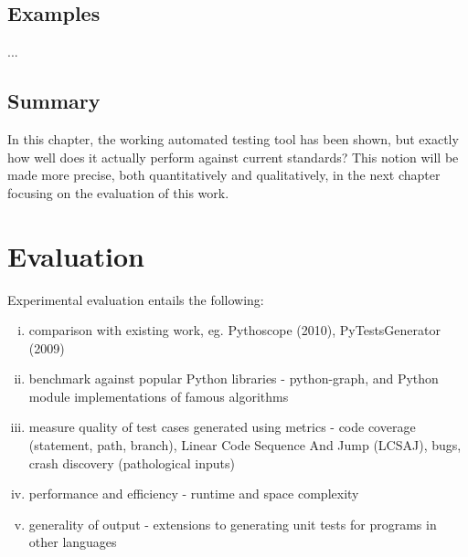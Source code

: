 \documentclass{icldt}
\numberwithin{equation}{section}       %
\begin{document}
\section{Examples}
...
\section{Summary}
In this chapter, the working automated testing tool has been shown, but exactly how well does it actually perform against current standards? This notion will be made more precise, both quantitatively and qualitatively, in the next chapter focusing on the evaluation of this work.
\chapter{Evaluation}
\label{ch:eval}

Experimental evaluation entails the following:
\begin{enumerate}[i.]
	\item comparison with existing work, eg. Pythoscope (2010), PyTestsGenerator (2009)
	\item benchmark against popular Python libraries - python-graph, and Python module implementations of famous algorithms
	\item measure quality of test cases generated using metrics - code coverage (statement, path, branch), Linear Code Sequence And Jump (LCSAJ), bugs, crash discovery (pathological inputs)
	\item performance and efficiency - runtime and space complexity
	\item generality of output - extensions to generating unit tests for programs in other languages
\end{enumerate}
\end{document}
